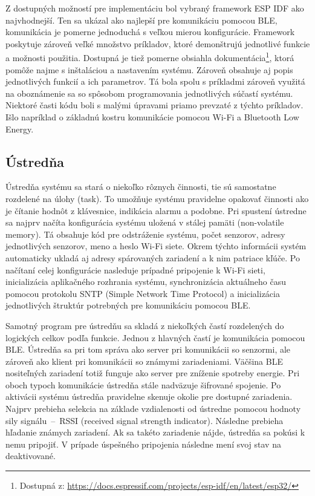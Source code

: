 Z dostupných možností pre implementáciu bol vybraný framework ESP IDF ako najvhodnejší. Ten sa ukázal ako najlepší pre komunikáciu pomocou BLE, komunikácia je pomerne jednoduchá s veľkou mierou konfigurácie. Framework poskytuje zároveň veľké množstvo príkladov, ktoré demonštrujú jednotlivé funkcie a možnosti použitia. Dostupná je tiež pomerne obsiahla dokumentácia\footnote{Dostupná z: \url{https://docs.espressif.com/projects/esp-idf/en/latest/esp32/}}, ktorá pomôže najme s inštaláciou a nastavením systému. Zároveň obsahuje aj popis jednotlivých funkcií a ich parametrov. Tá bola spolu s príkladmi zároveň využitá na oboznámenie sa so spôsobom programovania jednotlivých súčastí systému. Niektoré časti kódu boli s malými úpravami priamo prevzaté z týchto príkladov. Išlo napríklad o základnú kostru komunikácie pomocou Wi-Fi a Bluetooth Low Energy.

\subsection{Ústredňa}

Ústredňa systému sa stará o niekoľko rôznych činnosti, tie sú samostatne rozdelené na úlohy (task). To umožňuje systému pravidelne opakovať činnosti ako je čítanie hodnôt z klávesnice, indikácia alarmu a podobne. Pri spustení ústredne sa najprv načíta konfigurácia systému uložená v stálej pamäti (non-volatile memory). Tá obsahuje kód pre odstráženie systému, počet senzorov, adresy jednotlivých senzorov, meno a heslo Wi-Fi siete. Okrem týchto informácii systém automaticky ukladá aj adresy spárovaných zariadení a k nim patriace kľúče. Po načítaní celej konfigurácie nasleduje prípadné pripojenie k Wi-Fi sieti, inicializácia aplikačného rozhrania systému, synchronizácia aktuálneho času pomocou protokolu SNTP (Simple Network Time Protocol) a inicializácia jednotlivých štruktúr potrebných pre komunikáciu pomocou BLE. 

Samotný program pre ústredňu sa skladá z niekoľkých častí rozdelených do logických celkov podľa funkcie. Jednou z hlavných častí je komunikácia pomocou BLE. Ústredňa sa pri tom správa ako server pri komunikácii so senzormi, ale zároveň ako klient pri komunikácii so známymi zariadeniami. Väčšina BLE nositeľných zariadení totiž funguje ako server pre zníženie spotreby energie. Pri oboch typoch komunikácie ústredňa stále nadväzuje šifrované spojenie. Po aktivácii systému ústredňa pravidelne skenuje okolie pre dostupné zariadenia. Najprv prebieha selekcia na základe vzdialenosti od ústredne pomocou hodnoty sily signálu~--~RSSI (received signal strength indicator). Následne prebieha hľadanie známych zariadení. Ak sa takéto zariadenie nájde, ústredňa sa pokúsi k nemu pripojiť. V prípade úspešného pripojenia následne mení svoj stav na deaktivované.

